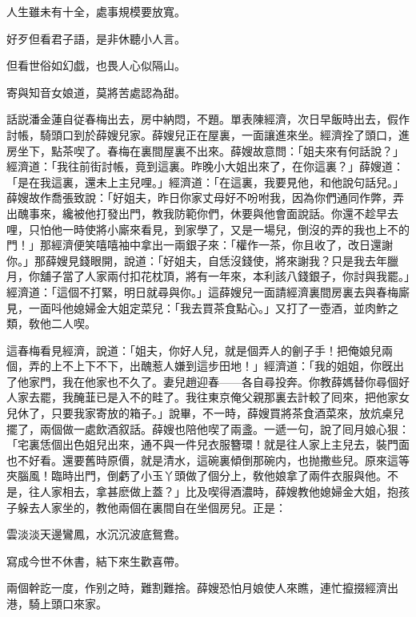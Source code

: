 人生雖未有十全，處事規模要放寬。

好歹但看君子語，是非休聽小人言。

但看世俗如幻戯，也畏人心似隔山。

寄與知音女娘道，莫將苦處認為甜。

話説潘金蓮自従春梅出去，房中納悶，不題。單表陳經濟，次日早飯時出去，假作討帳，騎頭口到於薛嫂兒家。薛嫂兒正在屋裏，一面讓進來坐。經濟拴了頭口，進房坐下，點茶喫了。春梅在裏間屋裏不出來。薛嫂故意問：「姐夫來有何話說？」經濟道：「我往前街討帳，竟到這裏。昨晚小大姐出來了，在你這裏？」薛嫂道：「是在我這裏，還未上主兒哩。」經濟道：「在這裏，我要見他，和他說句話兒。」薛嫂故作喬張致說：「好姐夫，昨日你家丈母好不吩咐我，因為你們通同作弊，弄出醜事來，纔被他打發出門，教我防範你們，休要與他會面說話。你還不趁早去哩，只怕他一時使將小廝來看見，到家學了，又是一場兒，倒沒的弄的我也上不的門！」那經濟便笑嘻嘻袖中拿出一兩銀子來：「權作一茶，你且收了，改日還謝你。」那薛嫂見錢眼開，說道：「好姐夫，自恁沒錢使，將來謝我？只是我去年臘月，你舖子當了人家兩付扣花枕頂，將有一年來，本利該八錢銀子，你討與我罷。」經濟道：「這個不打緊，明日就尋與你。」這薛嫂兒一面請經濟裏間房裏去與春梅廝見，一面呌他媳婦金大姐定菜兒：「我去買茶食點心。」又打了一壺酒，並肉鮓之類，敎他二人喫。

這春梅看見經濟，說道：「姐夫，你好人兒，就是個弄人的劊子手！把俺娘兒兩個，弄的上不上下不下，出醜惹人嫌到這步田地！」經濟道：「我的姐姐，你旣出了他家門，我在他家也不久了。妻兒趙迎春——各自尋投奔。你教薛媽替你尋個好人家去罷，我醃韮已是入不的畦了。我往東京俺父親那裏去計較了囘來，把他家女兒休了，只要我家寄放的箱子。」說畢，不一時，薛嫂買將茶食酒菜來，放炕桌兒擺了，兩個做一處飲酒叙話。薛嫂也陪他喫了兩盞。一遞一句，說了囘月娘心狠：「宅裏恁個出色姐兒出來，通不與一件兒衣服簪環！就是往人家上主兒去，裝門面也不好看。還要舊時原價，就是清水，這碗裏傾倒那碗内，也抛撒些兒。原來這等夾腦風！臨時出門，倒虧了小玉丫頭做了個分上，敎他娘拿了兩件衣服與他。不是，往人家相去，拿甚麽做上蓋？」比及喫得酒濃時，薛嫂教他媳婦金大姐，抱孩子躲去人家坐的，教他兩個在裏間自在坐個房兒。正是：

雲淡淡天邊鸞鳳，水沉沉波底鴛鴦。

寫成今世不休書，結下來生歡喜帶。

兩個幹訖一度，作别之時，難割難捨。薛嫂恐怕月娘使人來瞧，連忙攛掇經濟出港，騎上頭口來家。

